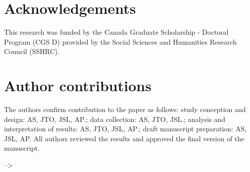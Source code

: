 \documentclass[]{trbunofficial}
\begin{document}
\hypertarget{acknowledgements}{%
\section{Acknowledgements}\label{acknowledgements}}

This research was funded by the Canada Graduate Scholarship - Doctoral
Program (CGS D) provided by the Social Sciences and Humanities Research
Council (SSHRC).

\hypertarget{author-contributions}{%
\section{Author contributions}\label{author-contributions}}

The authors confirm contribution to the paper as follows: study
conception and design: AS, JTO, JSL, AP.; data collection: AS, JTO,
JSL.; analysis and interpretation of results: AS, JTO, JSL, AP.; draft
manuscript preparation: AS, JSL, AP. All authors reviewed the results
and approved the final version of the manuscript.

--\textgreater{}

\newpage

\end{document}
